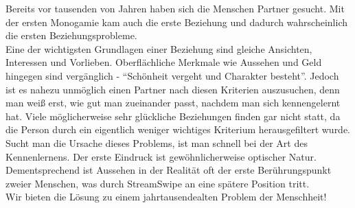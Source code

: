 
Bereits vor tausenden von Jahren haben sich die Menschen Partner gesucht.
Mit der ersten Monogamie kam auch die erste Beziehung und dadurch wahrscheinlich die ersten Beziehungsprobleme.\\
Eine der wichtigsten Grundlagen einer Beziehung sind gleiche Ansichten, Interessen und Vorlieben.
Oberflächliche Merkmale wie Aussehen und Geld hingegen sind vergänglich - \enquote{Schönheit vergeht und Charakter besteht}. Jedoch ist es nahezu unmöglich einen Partner nach diesen Kriterien  auszusuchen, denn man weiß erst, wie gut man zueinander passt, nachdem man sich kennengelernt hat. Viele möglicherweise sehr glückliche Beziehungen finden gar nicht statt, da die Person durch ein eigentlich weniger wichtiges Kriterium herausgefiltert wurde. Sucht man die Ursache dieses Problems, ist man schnell bei der Art des Kennenlernens. Der erste Eindruck ist gewöhnlicherweise optischer Natur. Dementsprechend ist Aussehen in der Realität oft der erste Berührungspunkt zweier Menschen, was durch StreamSwipe an eine spätere  Position tritt.\\
Wir bieten die Lösung zu einem jahrtausendealten Problem der Menschheit!

